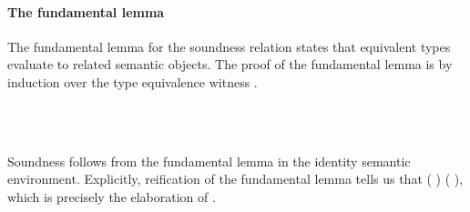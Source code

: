\documentclass[sigplan,screen]{acmart}
\begin{document}
\paragraph{The fundamental lemma}

The fundamental lemma for the soundness relation states that equivalent types evaluate to related semantic objects. The proof of the fundamental lemma is by induction over the type equivalence witness   .

\begin{AgdaAlign}
\begin{code}[hide]%
%
\>[2]\AgdaSpace{}%
\AgdaModule{\AgdaUnderscore{}}\AgdaSpace{}%
\AgdaSymbol{\{}\AgdaSymbol{\}}\AgdaSpace{}%
\AgdaSymbol{\{}\AgdaSymbol{\}}\AgdaSpace{}%
\AgdaSymbol{\{}\AgdaSymbol{\}}\AgdaSpace{}%
\AgdaSymbol{\{}\AgdaSpace{}%
\AgdaSpace{}%
\AgdaSymbol{:}\AgdaSpace{}%
\AgdaSpace{}%
\AgdaSpace{}%
\AgdaSymbol{\}}\AgdaSpace{}%
\AgdaSymbol{\{}\AgdaSpace{}%
\AgdaSpace{}%
\AgdaSymbol{:}\AgdaSpace{}%
\AgdaSpace{}%
\AgdaSpace{}%
\AgdaSymbol{\}}\AgdaSpace{}%
\<%
\end{code}
\begin{code}%
\>[2][@{}l@{\AgdaIndent{1}}]%
\>[4]\AgdaSpace{}%
\AgdaSymbol{:}%
\>[3296I]\AgdaSpace{}%
\AgdaSpace{}%
\AgdaSpace{}%
\<%
\\
\>[.][@{}l@{}]\<[3296I]%
\>[13]\AgdaSpace{}%
\AgdaSpace{}%
\AgdaSpace{}%
\<%
\\
%
\>[13]\AgdaSpace{}%
\AgdaSpace{}%
\AgdaSpace{}%
\AgdaSpace{}%
\AgdaSpace{}%
\AgdaSpace{}%
\AgdaSpace{}%
\AgdaSpace{}%
\<%
\end{code}
\begin{code}[hide]%
%
\>[4]\AgdaSpace{}%
\AgdaSymbol{=}\AgdaSpace{}%
\<%
\end{code}
\end{AgdaAlign}

Soundness follows from the fundamental lemma in the identity semantic environment. Explicitly, reification of the fundamental lemma tells us that  (   )   (   ), which is precisely the elaboration of     .
\end{document}
